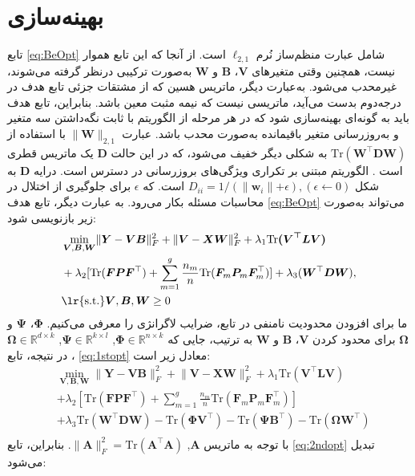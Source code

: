 \section{بهینه‌سازی}\label{OPT} 
تابع \eqref{eq:BeOpt} شامل عبارت منظم‌ساز نُرم $\ell_{2,1} $ است. از آنجا که این تابع هموار نیست، همچنین وقتی متغیرهای $\bm{V}$، $\bm{B}$ و $\bm{W}$ به‌صورت ترکیبی درنظر گرفته می‌شوند، غیرمحدب می‌شود. به‌عبارت دیگر، ماتریس هسین که از مشتقات جزئی تابع هدف در درجه‌دوم بدست می‌آید، ماتریسی نیست که نیمه مثبت معین باشد. بنابراین، تابع هدف باید به گونه‌ای بهینه‌سازی شود که در هر مرحله از الگوریتم با ثابت نگه‌داشتن سه متغیر و به‌روزرسانی متغیر باقیمانده به‌صورت محدب باشد. عبارت $\lVert\bm{W}\rVert_{2,1}$ با استفاده از $\mathrm{Tr} (\bm{W^\top DW})$ به شکلی دیگر خفیف می‌شود، که در این حالت $\bm{D}$ یک ماتریس قطری است \cite{hu2020multi}. الگوریتم مبتنی بر تکراری ویژگی‌های بروزرسانی در دسترس است. درایه $\bm{D}$ به شکل $D_{ii} = 1/(\lVert \bm{w}_i\lVert+\epsilon),(\epsilon\leftarrow0)$ است.
که $\epsilon$ برای جلوگیری از اختلال در محاسبات مسئله بکار می‌رود. به عبارت دیگر، تابع هدف \eqref{eq:BeOpt} می‌تواند به‌صورت زیر بازنویسی شود:
\begin{align}\label{eq:1stopt}
	&\min_{\bm{V},\bm{B},\bm{W}}\lVert\bm{Y}-\bm{V}\bm{B}\rVert^2_F+\lVert\bm{V}-\bm{X}\bm{W}\rVert^2_F+\lambda_1{\mathrm{Tr}\bm{({V}^\top{LV})}}\nonumber \\
	&+\lambda_2[\mathrm{Tr}(\bm{FP}\bm{F}^\top)+\sum_{m=1}^{g}\frac{n_m}{n}\mathrm{Tr}(\bm{F}_m\bm{P}_m\bm{F}^\top_m) ]+ \lambda_3(\bm{W}^\top \bm{DW}),\nonumber\\
	& {\text{\lr{s.t.}}}\bm{V},\bm{B},\bm{W}\geq 0 
\end{align}
ما برای افزودن محدودیت نامنفی در تابع، ضرایب لاگرانژی را معرفی می‌کنیم. 
$\bm{\Phi}$، $\bm{\Psi}$
و $\bm{\Omega}$ برای محدود کردن $\bm{V}$، $\bm{B}$ و $\bm{W}$ به ترتیب، جایی که $\bm{\Phi} \in\mathbb {R}^{n \times k}$, $\bm{\Psi} \in\mathbb{R}^{k \times l}$, $\bm{\Omega} \in\mathbb{R}^ {d \times k}$، در نتیجه، تابع \eqref{eq:1stopt} معادل زیر است:
\begin{align}\label{eq:2ndopt}
	&\min_{\bm{V}, \bm{B}, \bm{W}}\lVert\bm{Y}-\bm{V}\bm{B}\lVert^2_F + \lVert\bm{V}-\bm{X}\bm{W}\lVert^2_F+ \lambda_1\mathrm{Tr}(\bm{V}^\top \bm{LV})\nonumber \\
	&+\lambda_2[\mathrm{Tr}(\bm{F}\bm{P}\bm{F}^\top) + \sum_{m=1}^{g}\frac{n_m}{n}\mathrm{Tr}(\bm{F}_m\bm{P}_m\bm{F}_m^\top)]\nonumber\\
	&+\lambda_3\mathrm{Tr}(\bm{W}^\top \bm{D}\bm{W})- \mathrm{Tr}(\bm{\Phi}\bm{V}^\top)    -\mathrm{Tr}(\bm{\Psi}\bm{B}^\top)-\mathrm{Tr}(\bm{\Omega}\bm{W}^\top)\nonumber\\
\end{align}
با توجه به ماتریس $\bm{A}$, $\lVert \bm{A} \lVert^2_F = \mathrm{Tr}(\bm{A}^\top \bm{A})$. بنابراین، تابع \eqref{eq:2ndopt} تبدیل می‌شود:

